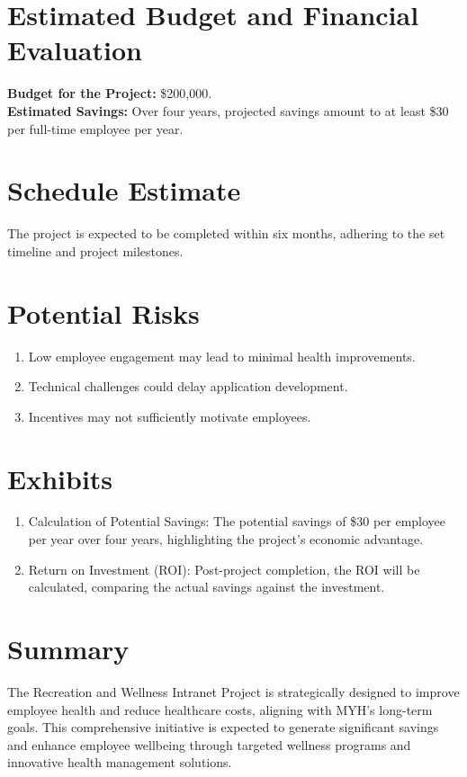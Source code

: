 \documentclass{article}
\begin{document}
\section*{Estimated Budget and Financial Evaluation}
\textbf{Budget for the Project:} \$200,000.\\
\textbf{Estimated Savings:} Over four years, projected savings amount to at least \$30 per full-time employee per year.

\section*{Schedule Estimate}
The project is expected to be completed within six months, adhering to the set timeline and project milestones.

\section*{Potential Risks}
\begin{enumerate}
    \item Low employee engagement may lead to minimal health improvements.
    \item Technical challenges could delay application development.
    \item Incentives may not sufficiently motivate employees.
\end{enumerate}

\section*{Exhibits}
\begin{enumerate}
    \item Calculation of Potential Savings: The potential savings of \$30 per employee per year over four years, highlighting the project's economic advantage.
    \item Return on Investment (ROI): Post-project completion, the ROI will be calculated, comparing the actual savings against the investment.
\end{enumerate}

\section*{Summary}
The Recreation and Wellness Intranet Project is strategically designed to improve employee health and reduce healthcare costs, aligning with MYH’s long-term goals. This comprehensive initiative is expected to generate significant savings and enhance employee wellbeing through targeted wellness programs and innovative health management solutions.
\end{document}
